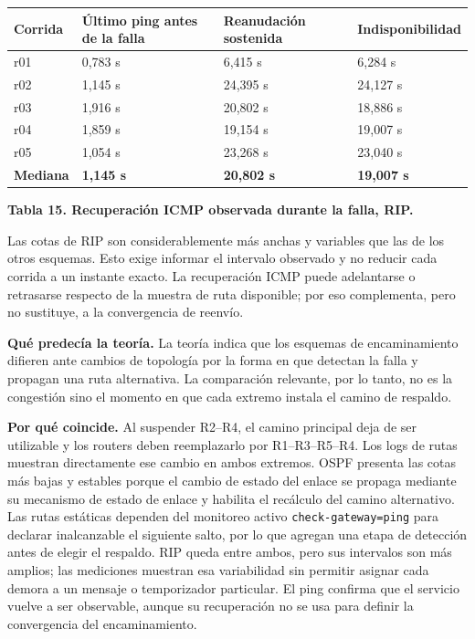 \documentclass[11pt,a4paper]{article}
\newcommand{\figcaption}[1]{\par\noindent\footnotesize\textbf{#1}\par\vspace{0.4cm}}
\begin{document}
\needspace{1cm}
\begin{center}
\begin{minipage}{0.9\linewidth}
\centering
\small
\setlength{\tabcolsep}{3pt}
\begin{tabular}{@{}p{2cm}p{4cm}p{4cm}p{3cm}@{}}
\toprule
\textbf{Corrida} & \textbf{\'Ultimo ping antes de la falla} & \textbf{Reanudaci\'on sostenida} & \textbf{Indisponibilidad} \\
\midrule
r01 & 0,783 s & 6,415 s & 6,284 s \\
r02 & 1,145 s & 24,395 s & 24,127 s \\
r03 & 1,916 s & 20,802 s & 18,886 s \\
r04 & 1,859 s & 19,154 s & 19,007 s \\
r05 & 1,054 s & 23,268 s & 23,040 s \\
\midrule
\textbf{Mediana} & \textbf{1,145 s} & \textbf{20,802 s} & \textbf{19,007 s} \\
\bottomrule
\end{tabular}
\par\vspace{0.1cm}
\figcaption{Tabla 15. Recuperaci\'on ICMP observada durante la falla, RIP.}
\end{minipage}
\end{center}

Las cotas de RIP son considerablemente m\'as anchas y variables que las de los otros esquemas. Esto exige informar el intervalo observado y no reducir cada corrida a un instante exacto. La recuperaci\'on ICMP puede adelantarse o retrasarse respecto de la muestra de ruta disponible; por eso complementa, pero no sustituye, a la convergencia de reenv\'io.

\textbf{Qu\'e predec\'ia la teor\'ia.} La teor\'ia indica que los esquemas de encaminamiento difieren ante cambios de topolog\'ia por la forma en que detectan la falla y propagan una ruta alternativa. La comparaci\'on relevante, por lo tanto, no es la congesti\'on sino el momento en que cada extremo instala el camino de respaldo.

\textbf{Por qu\'e coincide.} Al suspender R2--R4, el camino principal deja de ser utilizable y los routers deben reemplazarlo por R1--R3--R5--R4. Los logs de rutas muestran directamente ese cambio en ambos extremos. OSPF presenta las cotas m\'as bajas y estables porque el cambio de estado del enlace se propaga mediante su mecanismo de estado de enlace y habilita el rec\'alculo del camino alternativo. Las rutas est\'aticas dependen del monitoreo activo \texttt{check-gateway=ping} para declarar inalcanzable el siguiente salto, por lo que agregan una etapa de detecci\'on antes de elegir el respaldo. RIP queda entre ambos, pero sus intervalos son m\'as amplios; las mediciones muestran esa variabilidad sin permitir asignar cada demora a un mensaje o temporizador particular. El ping confirma que el servicio vuelve a ser observable, aunque su recuperaci\'on no se usa para definir la convergencia del encaminamiento.
\end{document}
